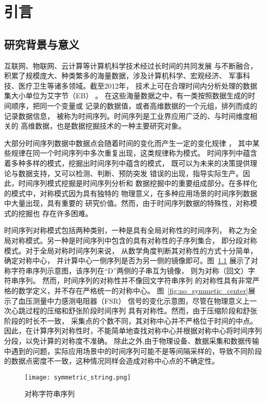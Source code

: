 
\chapter{引言}

\section{研究背景与意义}
互联网、物联网、云计算等计算机科学技术经过长时间的共同发展
与不断融合，积累了规模庞大、种类繁多的海量数据，涉及计算机科学、宏观经济、
军事科技、医疗卫生等诸多领域。截至2012年，
技术上可在合理时间内分析处理的数据集大小单位为艾字节（EB）
\cite{DBLP:journals/jbd/TsaiLCV15}。
在这些海量数据之中，有一类按照数据生成的时间顺序，把同一个变量或
记录的数据值，或者高维数据的一个元组，排列而成的记录数据信息，
被称为时间序列。时间序列是工业界应用广泛的、与时间维度相关的
高维数据，也是数据挖掘技术的一种主要研究对象。

大部分时间序列数据中数据点会随着时间的变化而产生一定的变化规律
\cite{DBLP:conf/sdm/MueenKZCW09}，
其中某些规律在同一个时间序列中多次重复出现，这类规律称为模式。
时间序列中蕴含着多种多样的模式，挖掘出时间序列中蕴含的模式，
既可以为未来的决策提供理论与数据支持，又可以检测、判断、预防突发
错误的出现，指导实际生产。因此，时间序列模式挖掘是时间序列分析和
数据挖掘中的重要组成部分。在多样化的模式中，对称模式因为具有独特的
物理意义，在多种应用场景的时间序列数据中大量出现，具有重要的
研究价值\cite{2022968}。然而，由于时间序列数据的特殊性，对称模式的挖掘也
存在许多困难。

时间序列对称模式包括两种类别，一种是具有全局对称性的时间序列，
称之为全局对称模式。另一种是时间序列中包含的具有对称性的子序列集合，
即分段对称模式。对于全局对称时间序列来说，
从数学角度判断其对称性的方式十分简单，确定对称中心，
并计算中心一侧序列是否为另一侧的镜像即可。图~\ref{fig:symmetric_string}
展示了对称字符串序列示意图，该序列在“D”两侧的子串互为镜像，
则为对称（回文）字符串序列\cite{DBLP:journals/corr/abs-2003-08211}。
然而，时间序列的对称性并不像回文字符串序列
的对称性具有非常严格的数学定义，并不存在严格统一的对称中心。
图~\ref{fig:no_symmetic_center}展示了血压测量中力感测电阻器（FSR）
信号的变化示意图，尽管在物理意义上一次心跳过程的压缩和舒张阶段时间序列
具有对称性。然而，由于压缩阶段和舒张阶段的时长不一致，
采集点的个数不同，其对称中心并不严格位于时间的中点。
因此，在计算序列对称性时，不能简单地查找对称中心并根据对称中心将时间序列
分段，以免计算的对称度不准确\cite{DBLP:journals/csda/DaiNG18}。
除此之外,由于物理设备、数据采集和数据传输
中遇到的问题，实际应用场景中的时间序列可能不是等间隔采样的，导致不同阶段
的数据点密度不一致，这种情况同样会造成对称中心点的不确定性。
\begin{figure}[t]
  \centering
  \texttt{[image: symmetric\_string.png]}
  \caption{对称字符串序列}
  \label{fig:symmetric_string}
\end{figure}

